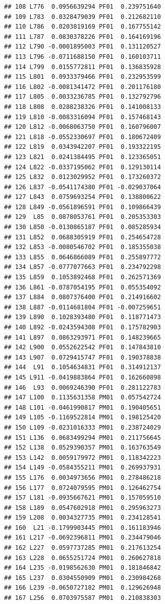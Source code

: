 \documentclass[
]{article}
\begin{document}
\begin{verbatim}
## 108 L776  0.0956639294 PF01  0.239751640
## 109 L783  0.0328479039 PF01  0.212682110
## 110 L786  0.0203819169 PF01  0.167755142
## 111 L787  0.0830378226 PF01  0.164169196
## 112 L790 -0.0001895003 PF01  0.131120527
## 113 L796 -0.0711688150 PF01  0.160103711
## 114 L799  0.0155772811 PF01  0.136835928
## 115 L801  0.0933379466 PF01  0.232953599
## 116 L802 -0.0081341472 PF01  0.201176180
## 117 L805  0.0033236785 PF01  0.132792796
## 118 L808  0.0288238326 PF01  0.141008133
## 119 L810 -0.0083316094 PF01  0.157468143
## 120 L812 -0.0068063750 PF01  0.160796007
## 121 L818 -0.0552330697 PF01  0.180672409
## 122 L819  0.0343942207 PF01  0.193322195
## 123 L821  0.0241384495 PF01  0.123365051
## 124 L822 -0.0337195062 PF01  0.129130114
## 125 L832  0.0123029952 PF01  0.173260372
## 126 L837 -0.0541174380 PF01 -0.029037064
## 127 L843  0.0759693254 PF01  0.138800622
## 128 L849 -0.0561896591 PF01  0.109866439
## 129  L85  0.0878053761 PF01  0.205353303
## 130 L850 -0.0130865187 PF01  0.085285934
## 131 L852  0.0688305919 PF01  0.254654728
## 132 L853 -0.0080546702 PF01  0.185355038
## 133 L855  0.0646866089 PF01  0.255897772
## 134 L857 -0.0777077663 PF01  0.234792298
## 135 L859  0.1053892468 PF01  0.262571369
## 136 L861 -0.0787054195 PF01  0.055354092
## 137 L884  0.0807376400 PF01  0.214916602
## 138 L887 -0.0114681804 PF01 -0.007259651
## 139 L890  0.1028393480 PF01  0.118771473
## 140 L892 -0.0243594308 PF01  0.175782903
## 141 L897  0.0863293971 PF01  0.148239665
## 142 L900  0.0552622542 PF01  0.147843810
## 143 L907  0.0729415747 PF01  0.190378838
## 144  L91  0.1054634831 PF01  0.314912137
## 145 L911 -0.0419883864 PF01  0.162660898
## 146  L93  0.0069246390 PF01  0.281122783
## 147 L100  0.1135631358 PM01  0.057542724
## 148 L101 -0.0461990817 PM01  0.190405651
## 149 L105 -0.1169522814 PM01  0.198125420
## 150 L109 -0.0231016333 PM01  0.238724029
## 151 L136  0.0683499294 PM01  0.211756645
## 152 L138  0.0529390357 PM01  0.163763549
## 153 L142  0.0059179972 PM01  0.118342223
## 154 L149 -0.0584355211 PM01  0.269937931
## 155 L176  0.0034973656 PM01  0.278486218
## 156 L177  0.0724079595 PM01  0.126462754
## 157 L181 -0.0935667621 PM01  0.157059510
## 158 L189  0.0547602918 PM01  0.295963273
## 159 L208  0.0034327735 PM01  0.234128541
## 160  L21 -0.1799903445 PM01  0.161183946
## 161 L217 -0.0692396811 PM01  0.234479046
## 162 L227  0.0597737285 PM01  0.217613254
## 163 L228  0.0655251724 PM01  0.260627818
## 164 L235 -0.0198562630 PM01  0.181846842
## 165 L237  0.0304550909 PM01  0.230984268
## 166 L239 -0.0650727182 PM01  0.129626948
## 167 L256  0.0703975587 PM01  0.210838303

\end{verbatim}
\end{document}
